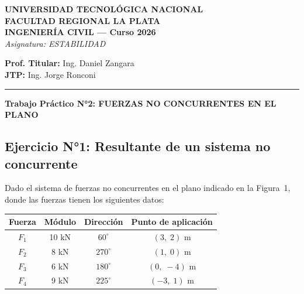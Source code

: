 \documentclass[11pt,a4paper]{article}
\begin{document}
\begin{center}
    \textbf{UNIVERSIDAD TECNOLÓGICA NACIONAL \\ FACULTAD REGIONAL LA PLATA} \\
    \vspace{0.2cm}
    \textbf{INGENIERÍA CIVIL — Curso 2026} \\
    \vspace{0.2cm}
    \textit{Asignatura: ESTABILIDAD}
\end{center}

\vspace{0.3cm}

\begin{flushleft}
    \textbf{Prof. Titular:} Ing. Daniel Zangara \\
    \textbf{JTP:} Ing. Jorge Ronconi \\
\end{flushleft}

\noindent\rule{\linewidth}{0.4pt}

\begin{center}
    \vspace{0.4cm}
    \Large \textbf{Trabajo Práctico N°2: FUERZAS NO CONCURRENTES EN EL PLANO} \\
    \vspace{0.4cm}
\end{center}

\subsection*{Ejercicio N°1: Resultante de un sistema no concurrente}

Dado el sistema de fuerzas no concurrentes en el plano indicado en la Figura~1,
donde las fuerzas tienen los siguientes datos:

\begin{center}
\begin{tabular}{cccc}
\hline
\textbf{Fuerza} & \textbf{Módulo} & \textbf{Dirección} & \textbf{Punto de aplicación} \\
\hline
$F_1$ & 10 kN & $60^\circ$  & $( 3,\; 2)$ m \\
$F_2$ & 8 kN  & $270^\circ$ & $( 1,\; 0)$ m \\
$F_3$ & 6 kN  & $180^\circ$ & $( 0,\;-4)$ m \\
$F_4$ & 9 kN  & $225^\circ$ & $(-3,\; 1)$ m \\
\hline
\end{tabular}
\end{center}
\end{document}
